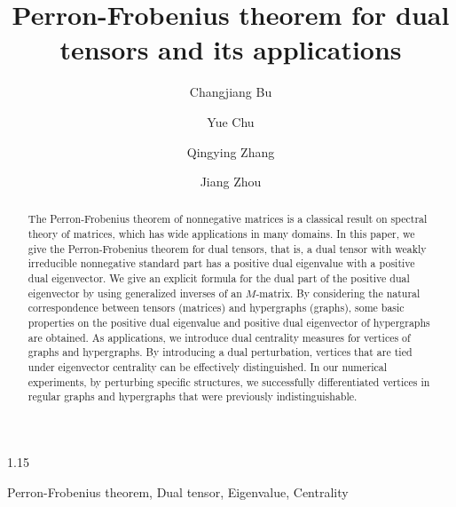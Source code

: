 \documentclass[preprint,12pt]{elsarticle}
\begin{document}
\begin{spacing}{1.15}


\begin{frontmatter}

\title{\textbf{Perron-Frobenius theorem for dual tensors and its applications}}
\author{Changjiang Bu}
\author{Yue Chu}
\author{Qingying Zhang}
\author{Jiang Zhou}
\address{College of Mathematical Sciences, Harbin Engineering University, Harbin 150001, PR China}

\begin{abstract}
The Perron-Frobenius theorem of nonnegative matrices is a classical result on spectral theory of matrices, which has wide applications in many domains. In this paper, we give the Perron-Frobenius theorem for dual tensors, that is, a dual tensor with weakly irreducible nonnegative standard part has a positive dual eigenvalue with a positive dual eigenvector. We give an explicit formula for the dual part of the positive dual eigenvector by using generalized inverses of an $M$-matrix. By considering the natural correspondence between tensors (matrices) and hypergraphs (graphs), some basic properties on the positive dual eigenvalue and positive dual eigenvector of hypergraphs are obtained. As applications, we introduce dual centrality measures for vertices of graphs and hypergraphs.
By introducing a dual perturbation, vertices that are tied under eigenvector centrality can be effectively distinguished. In our numerical experiments, by perturbing specific structures, we successfully differentiated vertices in regular graphs and hypergraphs that were previously indistinguishable.
\end{abstract}

\begin{keyword}
Perron-Frobenius theorem, Dual tensor, Eigenvalue, Centrality\\
\end{keyword}

\end{frontmatter}



\end{spacing}
\end{document}
